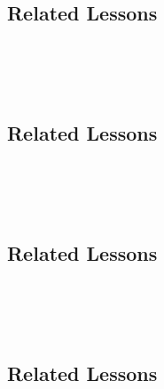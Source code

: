 \subsection{Related Lessons} 
\fouriOne{}\\
\fourhOne{}\\
\fourFKFourtySeven{}\\
%
\subsection{Related Lessons}
\fouriOne{}\\
\fourhOne{}\\
\fourFKFourtySeven{}\\

\subsection{Related Lessons}
\fouriOne{}\\
\fourhOne{}\\
\fourFKFourtySeven\\
%
\subsection{Related Lessons}
\fouraOne{}\\
\fouraTwo{}\\
\fouraThree{}\\
\fouraFour{}\\
\fouraFive{}\\
\fouraSix{}\\
\fouraNine{}\\
\fourdTwentyOne{}\\
